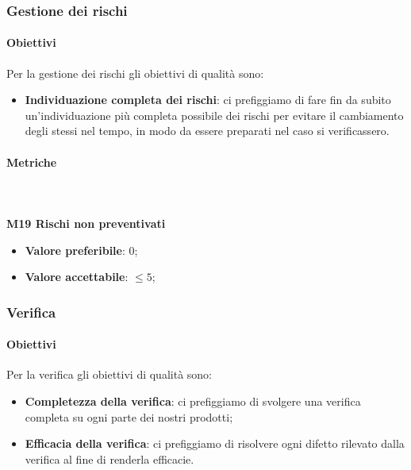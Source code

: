 		\subsubsection{Gestione dei rischi} 
			\paragraph{Obiettivi}
			Per la gestione dei rischi gli obiettivi di qualità sono:
			\begin{itemize}
				\item \textbf{Individuazione completa dei rischi}: ci prefiggiamo di fare fin da subito un'individuazione più completa possibile dei rischi per evitare il cambiamento degli stessi nel tempo, in modo da essere preparati nel caso si verificassero.
			\end{itemize}
			\paragraph{Metriche} \mbox{} \\ \\
			\textbf{M19 Rischi non preventivati} 
			\begin{itemize}
				\item \textbf{Valore preferibile}: 0;
				\item \textbf{Valore accettabile}: $ \le 5$;
			\end{itemize}

		\subsubsection{Verifica}
		\paragraph{Obiettivi}
		Per la verifica gli obiettivi di qualità sono:
		\begin{itemize}
			\item \textbf{Completezza della verifica}: ci prefiggiamo di svolgere una verifica completa su ogni parte dei nostri prodotti;
			\item \textbf{Efficacia della verifica}: ci prefiggiamo di risolvere ogni difetto rilevato dalla verifica al fine di renderla efficacie.
		\end{itemize}
